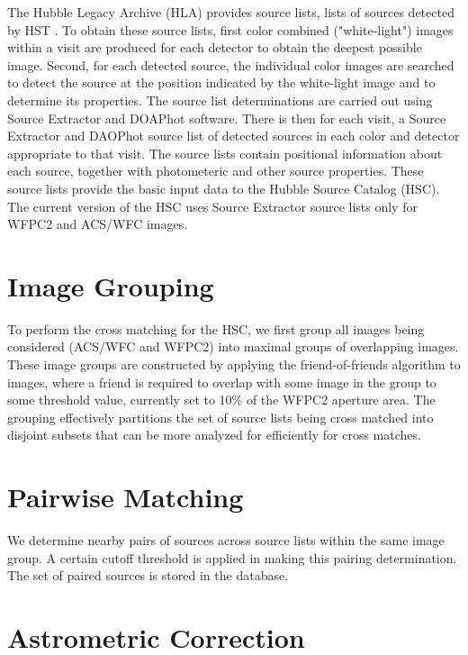 The Hubble Legacy Archive (HLA) provides source lists,
lists of sources detected by HST \cite{2008ASPC..394..481W}. To obtain these source lists,
first color combined ("white-light") images within a visit are produced for
each detector to obtain the deepest possible image.
Second, for each detected source, the individual color images 
are searched to detect the source at the position indicated by the white-light image
and to determine its properties.
The source list determinations are carried out using Source Extractor
and DOAPhot software. There is then for each visit, a Source Extractor and DAOPhot source list of detected
sources in each color and detector appropriate to that visit.
 The source lists contain positional information about each
source, together with photometeric and other source properties. 
These source lists provide the basic input data to the Hubble Source Catalog (HSC).
The current version of the HSC uses Source Extractor
source lists only for WFPC2 and ACS/WFC images.

\section{Image Grouping}
To perform the cross matching for the HSC, we first group all images
being considered (ACS/WFC and WFPC2) into maximal groups of overlapping
images.  These image groups are constructed by applying the friend-of-friends
algorithm to images, where a friend is required to overlap with some image
in the group to some threshold value, currently set to 10\% of the WFPC2 aperture area.
The grouping effectively partitions the set of source lists being cross matched into
disjoint subsets that can be more analyzed for efficiently for cross matches.

\section{Pairwise Matching}

We determine nearby pairs of sources across source lists within the same image group.
A certain cutoff threshold is applied in making this pairing determination.
The set of paired sources is stored in the database.

\section{Astrometric Correction}

